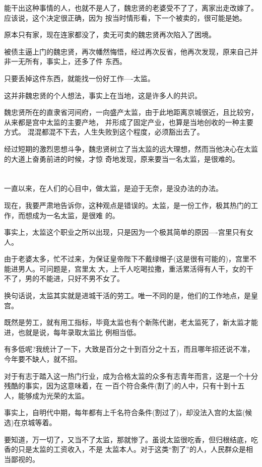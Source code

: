 \documentclass[11pt,a4paper,onecolumn]{article}
\begin{document}
能干出这种事情的人，也就不是人了，魏忠贤的老婆受不了了，离家出走改嫁了。应该说，这个决定很正确，因为
按当时情形看，下一个被卖的，很可能是她。

原本只有家，现在连家都没了，卖无可卖的魏忠贤再次陷入了困境。

被债主逼上门的魏忠贤，再次幡然悔悟，经过再次反省，他再次发现，原来自己并非一无所有，事实上，还多了件
东西。

只要丢掉这件东西，就能找一份好工作----太监。

这并非魏忠贤的个人想法，事实上在当地，这是许多人的共识。

魏忠贤所在的直隶省河间府，一向盛产太监，由于此地距离京城很近，且比较穷，从来都是宫中太监的主要产地，
并形成了固定产业，也算是当地创收的一种主要方式。 混混都混不下去，人生失败到这个程度，必须豁出去了。

经过短期的激烈思想斗争，魏忠贤树立了当太监的远大理想，然而当他决心在太监的大道上奋勇前进的时候，才惊
奇地发现，原来要当一名太监，是很难的。

\section[\thesection]{}

一直以来，在人们的心目中，做太监，是迫于无奈，是没办法的办法。

现在，我要严肃地告诉你，这种观点是错误的。太监，是一份工作，极其热门的工作，而想成为一名太监，是很难
的。

事实上，太监这个职业之所以出现，只是因为一个极其简单的原因----宫里只有女人。

由于老婆太多，忙不过来，为保证皇帝陛下不戴绿帽子(这是很有可能的)，宫里不能进男人。可问题是，宫里太
大，上千人吃喝拉撒，重活累活得有人干，女的干不了，男的不能进，只好不男不女了。

换句话说，太监其实就是进城干活的劳工。唯一不同的是，他们的工作地点，是皇宫。

既然是劳工，就有用工指标，毕竟太监也有个新陈代谢，老太监死了，新太监才能进，也就是说，每年录取太监比
例相当低。

有多低呢?我统计了一下，大致是百分之十到百分之十五，而且哪年招还说不准，今年要不缺人，就不招。

对于有志于踏入这一热门行业，成为合格太监的众多有志青年而言，这是一个十分残酷的事实，因为这意味着，在
一百个符合条件(割了)的人中，只有十到十五人，能够成为光荣的太监。

事实上，自明代中期，每年都有上千名符合条件(割过了)，却没法入宫的太监(候选)在京城等着。

要知道，万一切了，又当不了太监，那就惨了。虽说太监很吃香，但归根结底，吃香的只是太监的工资收入，不是
太监本人。对于这类``割了''的人，人民群众是相当鄙视的。
\end{document}
